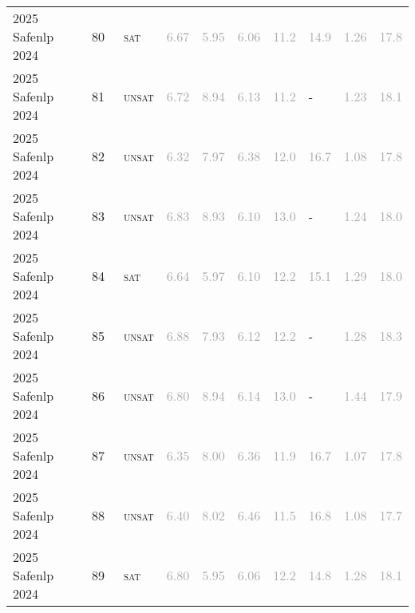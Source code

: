 \begin{center}
{\begin{longtable}{@{}llllllllll@{}}
2025 Safenlp 2024 & 80 & ~\textsc{sat} & \textcolor{darkgray}{6.67} & \textcolor{darkgray}{5.95} & \textcolor{darkgray}{6.06} & \textcolor{darkgray}{11.2} & \textcolor{darkgray}{14.9} & \textcolor{darkgray}{1.26} & \textcolor{darkgray}{17.8} \\
2025 Safenlp 2024 & 81 & ~\textsc{unsat} & \textcolor{darkgray}{6.72} & \textcolor{darkgray}{8.94} & \textcolor{darkgray}{6.13} & \textcolor{darkgray}{11.2} & - & \textcolor{darkgray}{1.23} & \textcolor{darkgray}{18.1} \\
2025 Safenlp 2024 & 82 & ~\textsc{unsat} & \textcolor{darkgray}{6.32} & \textcolor{darkgray}{7.97} & \textcolor{darkgray}{6.38} & \textcolor{darkgray}{12.0} & \textcolor{darkgray}{16.7} & \textcolor{darkgray}{1.08} & \textcolor{darkgray}{17.8} \\
2025 Safenlp 2024 & 83 & ~\textsc{unsat} & \textcolor{darkgray}{6.83} & \textcolor{darkgray}{8.93} & \textcolor{darkgray}{6.10} & \textcolor{darkgray}{13.0} & - & \textcolor{darkgray}{1.24} & \textcolor{darkgray}{18.0} \\
2025 Safenlp 2024 & 84 & ~\textsc{sat} & \textcolor{darkgray}{6.64} & \textcolor{darkgray}{5.97} & \textcolor{darkgray}{6.10} & \textcolor{darkgray}{12.2} & \textcolor{darkgray}{15.1} & \textcolor{darkgray}{1.29} & \textcolor{darkgray}{18.0} \\
2025 Safenlp 2024 & 85 & ~\textsc{unsat} & \textcolor{darkgray}{6.88} & \textcolor{darkgray}{7.93} & \textcolor{darkgray}{6.12} & \textcolor{darkgray}{12.2} & - & \textcolor{darkgray}{1.28} & \textcolor{darkgray}{18.3} \\
2025 Safenlp 2024 & 86 & ~\textsc{unsat} & \textcolor{darkgray}{6.80} & \textcolor{darkgray}{8.94} & \textcolor{darkgray}{6.14} & \textcolor{darkgray}{13.0} & - & \textcolor{darkgray}{1.44} & \textcolor{darkgray}{17.9} \\
2025 Safenlp 2024 & 87 & ~\textsc{unsat} & \textcolor{darkgray}{6.35} & \textcolor{darkgray}{8.00} & \textcolor{darkgray}{6.36} & \textcolor{darkgray}{11.9} & \textcolor{darkgray}{16.7} & \textcolor{darkgray}{1.07} & \textcolor{darkgray}{17.8} \\
2025 Safenlp 2024 & 88 & ~\textsc{unsat} & \textcolor{darkgray}{6.40} & \textcolor{darkgray}{8.02} & \textcolor{darkgray}{6.46} & \textcolor{darkgray}{11.5} & \textcolor{darkgray}{16.8} & \textcolor{darkgray}{1.08} & \textcolor{darkgray}{17.7} \\
2025 Safenlp 2024 & 89 & ~\textsc{sat} & \textcolor{darkgray}{6.80} & \textcolor{darkgray}{5.95} & \textcolor{darkgray}{6.06} & \textcolor{darkgray}{12.2} & \textcolor{darkgray}{14.8} & \textcolor{darkgray}{1.28} & \textcolor{darkgray}{18.1} \\

\end{longtable}}
\end{center}
